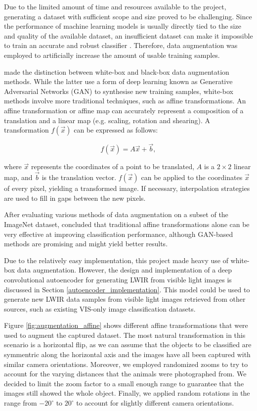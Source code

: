 \documentclass{l4proj}
\begin{document}
Due to the limited amount of time and resources available to the project, generating a dataset with sufficient scope and size proved to be challenging. Since the performance of machine learning models is usually directly tied to the size and quality of the available dataset, an insufficient dataset can make it impossible to train an accurate and robust classifier \citep{fawzi_adaptive_2016}. Therefore, data augmentation was employed to artificially increase the amount of usable training samples.

\citet{mikolajczyk_data_2018} made the distinction between white-box and black-box data augmentation methods. While the latter use a form of deep learning known as Generative Adversarial Networks (GAN) to synthesise new training samples, white-box methods involve more traditional techniques, such as affine transformations. An affine transformation or affine map can accurately represent a composition of a translation and a linear map (e.g. scaling, rotation and shearing). A transformation $f(\vec{x})$ can be expressed as follows:

\begin{equation}
  f(\vec{x}) = A \vec{x} + \vec{b},
  \label{eqn:affine}
\end{equation}

where $\vec{x}$ represents the coordinates of a point to be translated, $A$ is a $2 \times 2$ linear map, and $\vec{b}$ is the translation vector. $f(\vec{x})$ can be applied to the coordinates $\vec{x}$ of every pixel, yielding a transformed image. If necessary, interpolation strategies are used to fill in gaps between the new pixels.

After evaluating various methods of data augmentation on a subset of the ImageNet dataset, \citet{perez_effectiveness_2017} concluded that traditional affine transformations alone can be very effective at improving classification performance, although GAN-based methods are promising and might yield better results.

Due to the relatively easy implementation, this project made heavy use of white-box data augmentation. However, the design and implementation of a deep convolutional autoencoder for generating LWIR from visible light images is discussed in Section \ref{autoencoder_implementation}. This model could be used to generate new LWIR data samples from visible light images retrieved from other sources, such as existing VIS-only image classification datasets.

Figure \ref{fig:augmentation_affine} shows different affine transformations that were used to augment the captured dataset. The most natural transformation in this scenario is a horizontal flip, as we can assume that the objects to be classified are symmentric along the horizontal axis and the images have all been captured with similar camera orientations. Moreover, we employed randomized zooms to try to account for the varying distances that the animals were photographed from. We decided to limit the zoom factor to a small enough range to guarantee that the images still showed the whole object. Finally, we applied random rotations in the range from $-20^{\circ}$ to $20^{\circ}$ to account for slightly different camera orientations.
\end{document}
